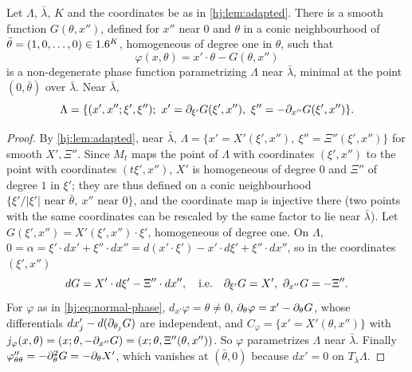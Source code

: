 \begin{theorem}\label{hj:thm:param-exists}
  Let $\Lambda$, $\bar\lambda$, $K$ and the coordinates be as in
  \cref{hj:lem:adapted}.  There is a smooth function $G(\theta,x'')$, defined
  for $x''$ near $0$ and $\theta$ in a conic neighbourhood of
  $\bar\theta=(1,0,\dots,0)\in1.6^K$, homogeneous of degree one in $\theta$, such
  that
  \begin{equation}\label{hj:eq:normal-phase}
    \varphi(x,\theta)=x'\cdot\theta-G(\theta,x'')
  \end{equation}
  is a non-degenerate phase function parametrizing $\Lambda$ near $\bar\lambda$,
  minimal at the point $(0,\bar\theta)$ over $\bar\lambda$.  Near $\bar\lambda$,
  \begin{equation*}
    \Lambda=\{(x',x'';\xi',\xi'');\ x'=\pa_{\xi'}G(\xi',x''),\
    \xi''=-\pa_{x''}G(\xi',x'')\}.
  \end{equation*}
\end{theorem}
\begin{proof}
  By \cref{hj:lem:adapted}, near $\bar\lambda$, $\Lambda=\{x'=X'(\xi',x''),\
  \xi''=\Xi''(\xi',x'')\}$ for smooth $X',\Xi''$.  Since $M_t$ maps the point of
  $\Lambda$ with coordinates $(\xi',x'')$ to the point with coordinates
  $(t\xi',x'')$, $X'$ is homogeneous of degree $0$ and $\Xi''$ of degree $1$ in
  $\xi'$; they are thus defined on a conic neighbourhood
  $\{\xi'/|\xi'|\text{ near }\bar\theta,\ x''\text{ near }0\}$, and the
  coordinate map is injective there (two points with the same coordinates can be
  rescaled by the same factor to lie near $\bar\lambda$).  Let
  $G(\xi',x'')=X'(\xi',x'')\cdot\xi'$, homogeneous of degree one.  On
  $\Lambda$, $0=\alpha=\xi'\cdot dx'+\xi''\cdot dx''=d(x'\cdot\xi')-x'\cdot d\xi'+
  \xi''\cdot dx''$, so in the coordinates $(\xi',x'')$
  \begin{equation*}
    dG=X'\cdot d\xi'-\Xi''\cdot dx'',\quad\text{i.e.}\quad \partial_{\xi'}G=X',\
    \partial_{x''}G=-\Xi''.
  \end{equation*}
  For $\varphi$ as in \eqref{hj:eq:normal-phase}, $d_{x'}\varphi=\theta\neq0$,
  $\partial_\theta\varphi=x'-\partial_\theta G$, whose differentials
  $dx'_j-d(\partial_{\theta_j}G)$ are independent, and $C_\varphi=\{x'=X'(\theta,x'')\}$
  with $j_\varphi(x,\theta)=(x;\theta,-\partial_{x''}G)=(x;\theta,\Xi''(\theta,x''))$.
  So $\varphi$ parametrizes $\Lambda$ near $\bar\lambda$.  Finally
  $\varphi''_{\theta\theta}=-\partial_\theta^2G=-\partial_\theta X'$, which vanishes at
  $(\bar\theta,0)$ because $dx'=0$ on $T_{\bar\lambda}\Lambda$.
\end{proof}

